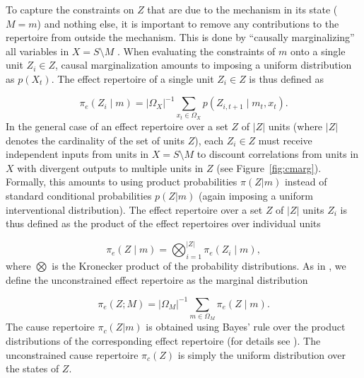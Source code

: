\documentclass[preprints, article, accept, pdftex, moreauthors, letterpaper]{Definitions/mdpi}
\renewcommand{\=}[1]{\stackrel{#1}{=}} %
\renewcommand{\*}{\otimes}%
\begin{document}
To capture the constraints on $Z$ that are due to the mechanism in its state ($M = m$) and nothing else, it is important to remove any contributions to the repertoire from outside the mechanism. This is done by ``causally marginalizing'' all variables in $X = S\setminus M$ \cite{Oizumi2014, Albantakis2019, Barbosa2021}. When evaluating the constraints of $m$ onto a single unit $Z_i \in Z$, causal marginalization amounts to imposing a uniform distribution as $p(X_t)$. 
The effect repertoire of a single unit $Z_i \in Z$ is thus defined as

\begin{equation}
\label{eq:cmarg}
\pi_e(Z_i \mid m) = |\Omega_{X}|^{-1} \sum_{x_t \in \Omega_{X}} p\left(Z_{i, t+1} \mid m_t,x_t\right).
\end{equation}
%
In the general case of an effect repertoire over a set $Z$ of $|Z|$ units (where $|Z|$ denotes the cardinality of the set of units $Z$), each $Z_i \in Z$ must receive independent inputs from units in $X = S\setminus M$ to discount correlations from units in $X$ with divergent outputs to multiple units in $Z$ (see Figure~\ref{fig:cmarg}). Formally, this amounts to using product probabilities $\pi(Z|m)$ instead of standard conditional probabilities $p(Z|m)$ (again imposing a uniform interventional distribution).
The effect repertoire over a set $Z$ of $|Z|$ units $Z_i$ is thus defined as the product of the effect repertoires over individual units 

\begin{equation}
\label{eq:effect_repertoire}
\pi_e(Z \mid m) = \bigotimes_{i=1}^{|Z|} \pi_e(Z_i \mid m),
\end{equation}
%
where $\bigotimes$ is the Kronecker product of the probability distributions. As in \cite{Albantakis2022_4_0}, we define the unconstrained effect repertoire as the marginal distribution

\begin{equation}
\label{eq:UCE}
    \pi_e(Z;M) = |\Omega_{M}|^{-1} \sum_{m \in \Omega_{M}} \pi_e(Z \mid m).
\end{equation}
%
The cause repertoire $\pi_c(Z|m)$ is obtained using Bayes' rule over the product distributions of the corresponding effect repertoire (for details see \cite{Barbosa2021, Albantakis2022_4_0}). The unconstrained cause repertoire $\pi_c(Z)$ is simply the uniform distribution over the states of $Z$.
\end{document}
